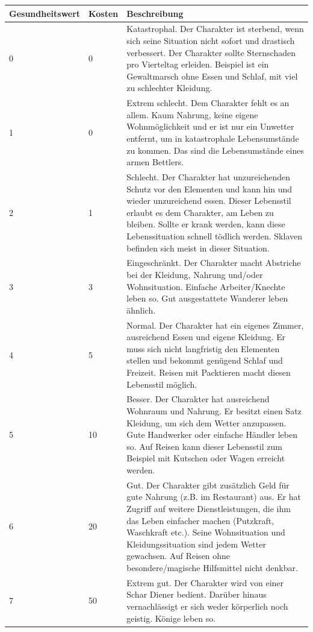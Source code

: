 \documentclass{article}
\begin{document}
\begin{small}
\begin{tabular}{|m{25mm}|m{15mm}|m{7cm}|}
\hline
\textbf{Gesundheitswert}&\textbf{Kosten}&\textbf{Beschreibung}\\
\hline
\hline
0&0&Katastrophal. Der Charakter ist sterbend, wenn sich seine Situation nicht sofort und drastisch verbessert. Der Charakter sollte Sternschaden pro Vierteltag erleiden. Beispiel ist ein Gewaltmarsch ohne Essen und Schlaf, mit viel zu schlechter Kleidung.\\
\hline
1&0&Extrem schlecht. Dem Charakter fehlt es an allem. Kaum Nahrung, keine eigene Wohnmöglichkeit und er ist nur ein Unwetter entfernt, um in katastrophale Lebensumstände zu kommen. Das sind die Lebensumstände eines armen Bettlers.\\
\hline
2&1&Schlecht. Der Charakter hat unzureichenden Schutz vor den Elementen und kann hin und wieder unzureichend essen. Dieser Lebensstil erlaubt es dem Charakter, am Leben zu bleiben. Sollte er krank werden, kann diese Lebenssituation schnell tödlich werden. Sklaven befinden sich meist in dieser Situation.\\
\hline
3&3&Eingeschränkt. Der Charakter macht Abstriche bei der Kleidung, Nahrung und/oder Wohnsituation. Einfache Arbeiter/Knechte leben so. Gut ausgestattete Wanderer leben ähnlich.\\
\hline
4&5&Normal. Der Charakter hat ein eigenes Zimmer, ausreichend Essen und eigene Kleidung. Er muss sich nicht langfristig den Elementen stellen und bekommt genügend Schlaf und Freizeit. Reisen mit Packtieren macht diesen Lebensstil möglich.\\
\hline
5&10&Besser. Der Charakter hat ausreichend Wohnraum und Nahrung. Er besitzt einen Satz Kleidung, um sich dem Wetter anzupassen. Gute Handwerker oder einfache Händler leben so. Auf Reisen kann dieser Lebensstil zum Beispiel mit Kutschen oder Wagen erreicht werden.\\
\hline
6&20&Gut. Der Charakter gibt zusätzlich Geld für gute Nahrung (z.B. im Restaurant) aus. Er hat Zugriff auf weitere Dienstleistungen, die ihm das Leben einfacher machen (Putzkraft, Waschkraft etc.). Seine Wohnsituation und Kleidungssituation sind jedem Wetter gewachsen. Auf Reisen ohne besondere/magische Hilfsmittel nicht denkbar.\\
\hline
7&50&Extrem gut. Der Charakter wird von einer Schar Diener bedient. Darüber hinaus vernachlässigt er sich weder körperlich noch geistig. Könige leben so.\\
\hline
\end{tabular}
\end{small}
\end{document}
